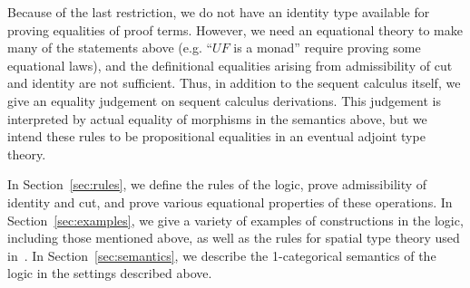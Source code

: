 \documentclass{drl-common/llncs}
\begin{document}
Because of the last restriction, we do not have an identity type
available for proving equalities of proof terms.  However, we need an
equational theory to make many of the statements above (e.g. ``$UF$ is a
monad'' require proving some equational laws), and the definitional
equalities arising from admissibility of cut and identity are not
sufficient.  Thus, in addition to the sequent calculus itself, we give
an equality judgement on sequent calculus derivations.  This judgement
is interpreted by actual equality of morphisms in the semantics above,
but we intend these rules to be propositional equalities in an eventual
adjoint type theory.

In Section~\ref{sec:rules}, we define the rules of the logic, prove
admissibility of identity and cut, and prove various equational
properties of these operations.  In Section~\ref{sec:examples}, we give
a variety of examples of constructions in the logic, including those
mentioned above, as well as the rules for spatial type theory used
in~\citep{shulman15realcohesion}.  In Section~\ref{sec:semantics}, we
describe the 1-categorical semantics of the logic in the settings
described above.




\end{document}
